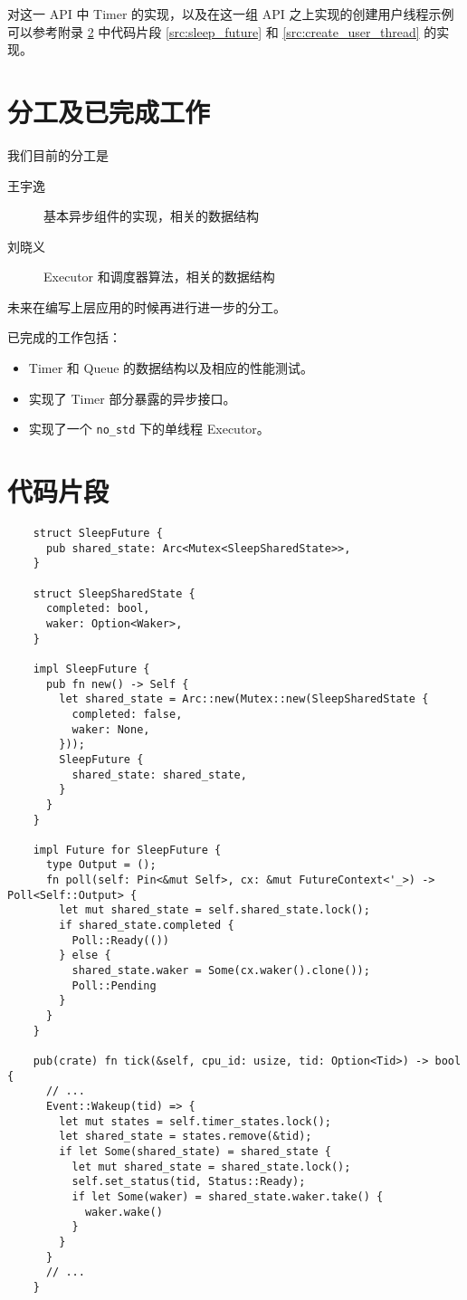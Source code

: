\documentclass[UTF-8]{ctexart}
\begin{document}
  对这一 API 中 Timer 的实现，以及在这一组 API 之上实现的创建用户线程示例可以参考附录 \ref{sec:code} 中代码片段 \ref{src:sleep_future} 和 \ref{src:create_user_thread} 的实现。

  \section{分工及已完成工作}
  我们目前的分工是
  \begin{description}
    \item[王宇逸] 基本异步组件的实现，相关的数据结构
    \item[刘晓义] Executor 和调度器算法，相关的数据结构
  \end{description}

  未来在编写上层应用的时候再进行进一步的分工。

  \vspace{2em}

  已完成的工作包括：
  \begin{itemize}
    \item Timer 和 Queue 的数据结构以及相应的性能测试。
    \item 实现了 Timer 部分暴露的异步接口。
    \item 实现了一个 \texttt{no\_std} 下的单线程 Executor。
  \end{itemize}

  \appendix
  \section{代码片段}
  \label{sec:code}

  {
  \begin{verbatim}
    struct SleepFuture {
      pub shared_state: Arc<Mutex<SleepSharedState>>,
    }

    struct SleepSharedState {
      completed: bool,
      waker: Option<Waker>,
    }

    impl SleepFuture {
      pub fn new() -> Self {
        let shared_state = Arc::new(Mutex::new(SleepSharedState {
          completed: false,
          waker: None,
        }));
        SleepFuture {
          shared_state: shared_state,
        }
      }
    }

    impl Future for SleepFuture {
      type Output = ();
      fn poll(self: Pin<&mut Self>, cx: &mut FutureContext<'_>) -> Poll<Self::Output> {
        let mut shared_state = self.shared_state.lock();
        if shared_state.completed {
          Poll::Ready(())
        } else {
          shared_state.waker = Some(cx.waker().clone());
          Poll::Pending
        }
      }
    }    

    pub(crate) fn tick(&self, cpu_id: usize, tid: Option<Tid>) -> bool {
      // ...
      Event::Wakeup(tid) => {
        let mut states = self.timer_states.lock();
        let shared_state = states.remove(&tid);
        if let Some(shared_state) = shared_state {
          let mut shared_state = shared_state.lock();
          self.set_status(tid, Status::Ready);
          if let Some(waker) = shared_state.waker.take() {
            waker.wake()
          }
        }
      }
      // ...
    }
  \end{verbatim}
  }
\end{document}
